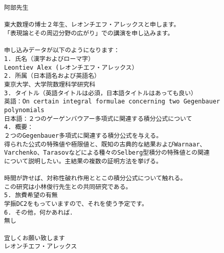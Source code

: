 \documentclass[a4paper]{report}
\begin{document}
\begin{verbatim}
阿部先生

東大数理の博士２年生、レオンチエフ・アレックスと申します。
「表現論とその周辺分野の広がり」での講演を申し込みます。

申し込みデータが以下のようになります：
1. 氏名（漢字およびローマ字）
Leontiev Alex (レオンチエフ・アレックス）
2. 所属（日本語名および英語名）
東京大学、大学院数理科学研究科
3. タイトル（英語タイトルは必須，日本語タイトルはあっても良い）
英語：On certain integral formulae concerning two Gegenbauer polynomials
日本語：２つのゲーゲンバウアー多項式に関連する積分公式について
4. 概要：
２つのGegenbauer多項式に関連する積分公式を与える。
得られた公式の特殊値や極限値と、既知の古典的な結果およびWarnaar、
Varchenko、Tarasovなどによる種々のSelberg型積分の特殊値との関連
について説明したい。主結果の複数の証明方法を挙げる。

時間が許せば、対称性破れ作用ととこの積分公式について触れる。
この研究は小林俊行先生との共同研究である。
5. 旅費希望の有無
学振DC2をもっていますので、それを使う予定です。
6. その他，何かあれば．
無し

宜しくお願い致します
レオンチエフ・アレックス
\end{verbatim}
\end{document}
